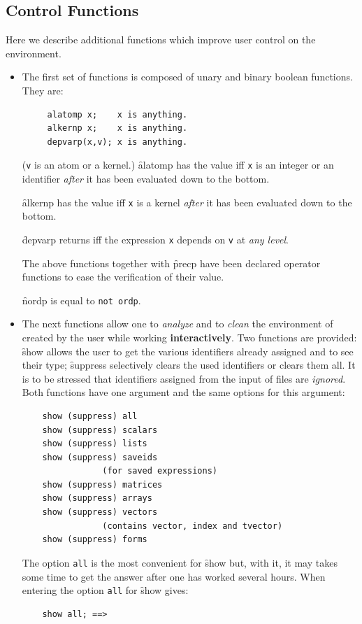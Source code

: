 \subsection{Control Functions}
Here we describe additional functions which
improve user control on the environment.
\begin{itemize}
\item[i.]
\hypertarget{operator:ALATOMP}{}
\hypertarget{operator:ALKERNP}{}
\hypertarget{operator:DEPVARP}{}
The first set of functions is composed of unary and binary boolean functions.
They are:
\begin{verbatim}
     alatomp x;    x is anything.
     alkernp x;    x is anything.
     depvarp(x,v); x is anything.
\end{verbatim}
(\texttt{v} is an atom or a kernel.)
\f{alatomp} has the value  iff \texttt{x} is an integer or  an identifier
\emph{after} it has been evaluated down to the bottom.

\f{alkernp} has the value  iff \texttt{x} is a kernel \emph{after}
it has been evaluated down to the bottom.

\f{depvarp} returns  iff the expression \texttt{x} depends on \texttt{v} at
\emph{any level}.

\hypertarget{operator:PRECP}{}
\hypertarget{operator:NORDP}{}
The above functions together with \f{precp} have
been declared operator functions to ease the verification of
their value.

\f{nordp} is equal to \texttt{not ordp}.
\item[ii.]
The next functions allow one to \emph{analyze} and to
\emph{clean} the environment
of \REDUCE created by the user while working
\textbf{interactively}. Two functions are provided:
%
%
\hypertarget{operator:SHOW}{}%
\hypertarget{operator:SUPPRESS}{}%
\f{show} allows the user to get the various identifiers already
assigned and to see their type; \f{suppress} selectively clears the
used identifiers or clears them all. It is to be stressed that identifiers
assigned from the input of files are \emph{ignored}.
Both functions have one argument and the same options for this
argument:
\begin{verbatim}
    show (suppress) all
    show (suppress) scalars
    show (suppress) lists
    show (suppress) saveids
                (for saved expressions)
    show (suppress) matrices
    show (suppress) arrays
    show (suppress) vectors
                (contains vector, index and tvector)
    show (suppress) forms
\end{verbatim}
The option \texttt{all} is the most convenient for \f{show} but,
with it, it may
takes some time to get the answer after one has worked several hours.
When entering \REDUCE the option \texttt{all} for \f{show} gives:
\begin{verbatim}
    show all; ==>


\end{verbatim}
\end{itemize}
